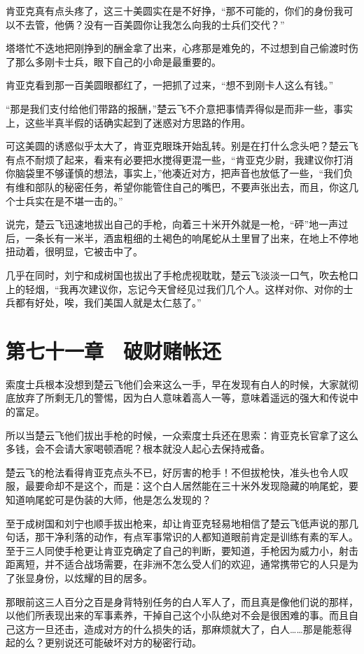 肯亚克真有点头疼了，这三十美圆实在是不好挣，“那不可能的，你们的身份我可以不去管，他俩？没有一百美圆你让我怎么向我的士兵们交代？”

塔塔忙不迭地把刚挣到的酬金拿了出来，心疼那是难免的，不过想到自己偷渡时伤了那么多刚卡士兵，眼下自己的小命是最重要的。

肯亚克看到那一百美圆眼都红了，一把抓了过来，“想不到刚卡人这么有钱。”

“那是我们支付给他们带路的报酬，”楚云飞不介意把事情弄得似是而非一些，事实上，这些半真半假的话确实起到了迷惑对方思路的作用。

可这美圆的诱惑似乎太大了，肯亚克眼珠开始乱转。别是在打什么念头吧？楚云飞有点不耐烦了起来，看来有必要把水搅得更混一些，“肯亚克少尉，我建议你打消你脑袋里不够谨慎的想法，事实上，”他凑近对方，把声音也放低了一些，“我们负有维和部队的秘密任务，希望你能管住自己的嘴巴，不要声张出去，而且，你这几个士兵实在是不堪一击的。”

说完，楚云飞迅速地拔出自己的手枪，向着三十米开外就是一枪，“砰”地一声过后，一条长有一米半，酒盅粗细的土褐色的响尾蛇从土里冒了出来，在地上不停地扭动着，很明显，它被击中了。

几乎在同时，刘宁和成树国也拔出了手枪虎视耽耽，楚云飞淡淡一口气，吹去枪口上的轻烟，“我再次建议你，忘记今天曾经见过我们几个人。这样对你、对你的士兵都有好处，唉，我们美国人就是太仁慈了。”

\section{第七十一章　破财赌帐还}

索度士兵根本没想到楚云飞他们会来这么一手，早在发现有白人的时候，大家就彻底放弃了所剩无几的警惕，因为白人意味着高人一等，意味着遥远的强大和传说中的富足。

所以当楚云飞他们拔出手枪的时候，一众索度士兵还在思索：肯亚克长官拿了这么多钱，会不会请大家喝顿酒呢？根本就没人起心去保持戒备。

楚云飞的枪法看得肯亚克点头不已，好厉害的枪手！不但拔枪快，准头也令人叹服，最要命却不是这个，而是：这个白人居然能在三十米外发现隐藏的响尾蛇，要知道响尾蛇可是伪装的大师，他是怎么发现的？

至于成树国和刘宁也顺手拔出枪来，却让肯亚克轻易地相信了楚云飞低声说的那几句话，那干净利落的动作，有点军事常识的人都知道眼前肯定是训练有素的军人。至于三人同使手枪更让肯亚克确定了自己的判断，要知道，手枪因为威力小，射击距离短，并不适合战场需要，在非洲不怎么受人们的欢迎，通常携带它的人只是为了张显身份，以炫耀的目的居多。

那眼前这三人百分之百是身背特别任务的白人军人了，而且真是像他们说的那样，以他们所表现出来的军事素养，干掉自己这个小队绝对不会是很困难的事。而且自己这方一旦还击，造成对方的什么损失的话，那麻烦就大了，白人……那是能惹得起的么？更别说还可能破坏对方的秘密行动。

